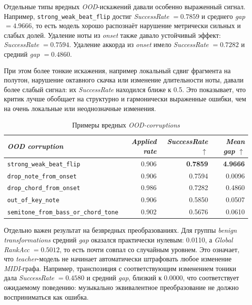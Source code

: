 \documentclass[a4paper,12pt]{extarticle}
\begin{document}
Отдельные типы вредных \textit{OOD}-искажений давали особенно выраженный сигнал. Например, \texttt{strong\_weak\_beat\_flip} достиг \textit{SuccessRate} $=0.7859$ и среднего \textit{gap} $=4.9666$, то есть модель хорошо распознаёт нарушение метрически сильных и слабых долей. Удаление ноты из \textit{onset} также давало устойчивый эффект: \textit{SuccessRate} $=0.7594$. Удаление аккорда из \textit{onset} имело \textit{SuccessRate} $=0.7282$ и средний \textit{gap} $=0.4860$.

При этом более тонкие искажения, например локальный сдвиг фрагмента на полутон, нарушение октавного скачка или изменение длительности ноты, давали более слабый сигнал: их \textit{SuccessRate} находился ближе к 0.5. Это показывает, что критик лучше обобщает на структурно и гармонически выраженные ошибки, чем на очень локальные или неоднозначные изменения.

\begin{table}[htbp]
\caption{Примеры вредных \textit{OOD-corruptions}}
\label{tab:ood-harmful-examples}
\centering
\footnotesize
\begin{tabular}{@{}p{7.0cm}rrr@{}}
\toprule
\textit{OOD corruption} & \textit{Applied rate} & \textit{SuccessRate} $\uparrow$ & \textit{Mean gap} $\uparrow$ \\
\midrule
\texttt{strong\_weak\_beat\_flip} & 0.906 & \textbf{0.7859} & \textbf{4.9666} \\
\texttt{drop\_note\_from\_onset} & 0.906 & 0.7594 & 0.0096 \\
\texttt{drop\_chord\_from\_onset} & 0.986 & 0.7282 & 0.4860 \\
\texttt{out\_of\_key\_note} & 0.906 & 0.5850 & 0.0507 \\
\texttt{semitone\_from\_bass\_or\_chord\_tone} & 0.902 & 0.5676 & 0.0610 \\
\bottomrule
\end{tabular}
\end{table}

Отдельно важен результат на безвредных преобразованиях. Для группы \textit{benign transformations} средний \textit{gap} оказался практически нулевым: 0.0110, а \textit{Global RankAcc} $=0.5012$, то есть почти совпал со случайным уровнем. Это означает, что \textit{teacher}-модель не начинает автоматически штрафовать любое изменение \textit{MIDI}-графа. Например, транспозиция с соответствующим изменением тоники дала \textit{SuccessRate} $=0.4580$ и средний \textit{gap}, близкий к 0.0000, что соответствует ожидаемому поведению: музыкально эквивалентное преобразование не должно восприниматься как ошибка.
\end{document}
